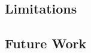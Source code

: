 \documentclass[11pt,a4paper]{article}
\begin{document}
\subsection{Limitations}
\label{subsec:limitations}


\subsection{Future Work}
\label{subsec:future_work}
\end{document}
